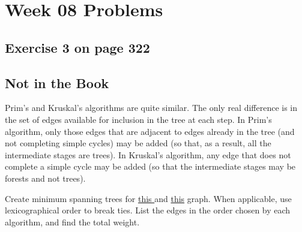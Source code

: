 \documentclass[12pt]{amsart}
\begin{document}
\section{Week 08 Problems}
\subsection{Exercise 3 on page 322}
\subsection{Not in the Book}

  Prim\textquoteright{}s and Kruskal\textquoteright{}s algorithms are quite similar. The only real difference is in the set of edges available for inclusion in the tree at each step. In Prim\textquoteright{}s algorithm, only those edges that are adjacent to edges already in the tree (and not completing simple cycles) may be added (so that, as a result, all the intermediate stages are trees). In Kruskal\textquoteright{}s algorithm, any edge that does not complete a simple cycle may be added (so that the intermediate stages may be forests and not trees). 
  
  Create minimum spanning trees for 
  \href{https://firstthreeodds.org/mstgraphs/mstgraph1.png}{ this } and \href{https://firstthreeodds.org/mstgraphs/mstgraph2.png}{this} graph. When applicable, use lexicographical order to break ties. List the edges in the order chosen by each algorithm, and find the total weight.


  
\end{document}
